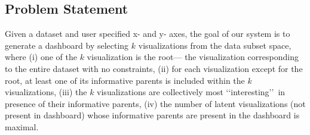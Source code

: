 
\subsection{Problem Statement}

Given a dataset and user specified x- and y- axes, the goal of our system is to generate a dashboard by selecting $k$ visualizations from the data subset space, where (i) one of the $k$ visualization is the root--- the visualization corresponding to the entire dataset with no constraints, (ii) for each visualization except for the root, at least one of its informative parents is included within the $k$ visualizations, (iii) the $k$ visualizations are collectively most \lq\lq interesting\rq\rq\ in presence of their informative parents, (iv) the number of latent visualizations (not present in dashboard) whose informative parents are present in the dashboard is maximal.


